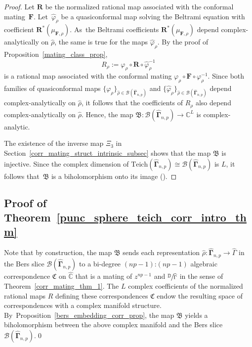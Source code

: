 \documentclass[JEP,XML,SOM,Unicode,NoFloatCountersInSection,published]{cedram}
\let\faktor\sfrac
\theoremstyle{definition}
\theoremstyle{remark}
\newcommand{\C}{\mathbb{C}}
\newcommand{\D}{\mathbb{D}}
\let\phi\varphi
\begin{document}
\begin{proof}
Let $\pmb{R}$ be the normalized rational map associated with the conformal mating~$\pmb{F}$. Let~$\widehat{\phi}_\rho$ be a quasiconformal map solving the Beltrami equation with coefficient $\pmb{R}^*(\mu_{\pmb{F},\rho})$. As~the Beltrami coefficients $\pmb{R}^*(\mu_{\pmb{F},\rho})$ depend complex-analytically on $\widehat{\rho}$, the same is true for the maps $\widehat{\phi}_\rho$.
By the proof of Proposition~\ref{mating_class_prop},
\[
R_\rho:=\phi_\rho\circ\pmb{R}\circ\widehat{\phi}_\rho^{-1}
\]
is a rational map associated with the conformal mating $\phi_\rho\circ\pmb{F}\circ\phi_\rho^{-1}$. Since both families of quasiconformal maps $\{\phi_\rho\}_{\widehat{\rho}\in\mathcal{B}(\widehat{\pmb{\Gamma}}_{n,p})}$ and $\{\widehat{\phi}_\rho\}_{\widehat{\rho}\in\mathcal{B}(\widehat{\pmb{\Gamma}}_{n,p})}$ depend complex-analytically on $\widehat{\rho}$, it follows that the coefficients of $R_\rho$ also depend complex-analytically on $\widehat{\rho}$.
Hence, the map $\mathfrak{B}:\mathcal{B}(\widehat{\pmb{\Gamma}}_{n,p})\to \C^L$ is complex-analytic.

The existence of the inverse map $\Xi_3$ in Section~\ref{corr_mating_struct_intrinsic_subsec} shows that the map $\mathfrak{B}$ is injective. Since the complex dimension of $\mathrm{Teich}(\widehat{\pmb{\Gamma}}_{n,p})\cong\mathcal{B}(\widehat{\pmb{\Gamma}}_{n,p})$ is $L$, it follows that~$\mathfrak{B}$ is a biholomorphism onto its image (\cf \cite[Th.\,2.14]{range}).
\end{proof}

\subsection{Proof of Theorem~\ref{punc_sphere_teich_corr_intro_thm}}\label{thm_c_prf_subsec}

Note that by construction, the map $\mathfrak{B}$ sends each representation $\widehat{\rho}:\widehat{\pmb{\Gamma}}_{n,p}\to\widehat{\Gamma}$ in the Bers slice $\mathcal{B}(\widehat{\pmb{\Gamma}}_{n,p})$ to a bi-degree $(np-1)$:$(np-1)$ algebraic correspondence $\mathfrak{C}$ on $\widehat{\C}$ that is a mating of $z^{np-1}$ and $\faktor{\D}{\widehat{\Gamma}}$ in the sense of Theorem~\ref{corr_mating_thm_1}. The $L$ complex coefficients of the normalized rational maps $R$ defining these correspondences $\mathfrak{C}$ endow the resulting space of correspondences with a complex manifold structure. By~Proposition~\ref{bers_embedding_corr_prop}, the map $\mathfrak{B}$ yields a biholomorphism between the above complex manifold and the Bers slice $\mathcal{B}(\widehat{\pmb{\Gamma}}_{n,p})$.\qed
\end{document}
